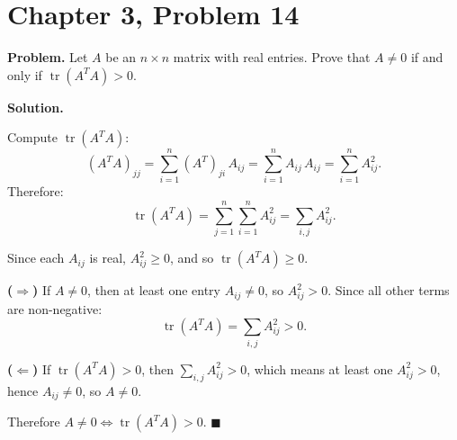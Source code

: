 \documentclass[12pt]{article}
\begin{document}
\section*{Chapter 3, Problem 14}

\textbf{Problem.} Let $A$ be an $n \times n$ matrix with real entries. Prove that $A \neq 0$ if and only if $\operatorname{tr}(A^T A) > 0$.

\bigskip
\textbf{Solution.}

Compute $\operatorname{tr}(A^T A)$:
\[
(A^T A)_{jj} = \sum_{i=1}^{n} (A^T)_{ji}\, A_{ij} = \sum_{i=1}^{n} A_{ij}\, A_{ij} = \sum_{i=1}^{n} A_{ij}^2.
\]
Therefore:
\[
\operatorname{tr}(A^T A) = \sum_{j=1}^{n} \sum_{i=1}^{n} A_{ij}^2 = \sum_{i,j} A_{ij}^2.
\]

Since each $A_{ij}$ is real, $A_{ij}^2 \ge 0$, and so $\operatorname{tr}(A^T A) \ge 0$.

\medskip
\textbf{($\Rightarrow$)} If $A \neq 0$, then at least one entry $A_{ij} \neq 0$, so $A_{ij}^2 > 0$. Since all other terms are non-negative:
\[
\operatorname{tr}(A^T A) = \sum_{i,j} A_{ij}^2 > 0.
\]

\textbf{($\Leftarrow$)} If $\operatorname{tr}(A^T A) > 0$, then $\sum_{i,j} A_{ij}^2 > 0$, which means at least one $A_{ij}^2 > 0$, hence $A_{ij} \neq 0$, so $A \neq 0$.

\medskip
Therefore $A \neq 0 \iff \operatorname{tr}(A^T A) > 0$. \hfill $\blacksquare$
\end{document}
